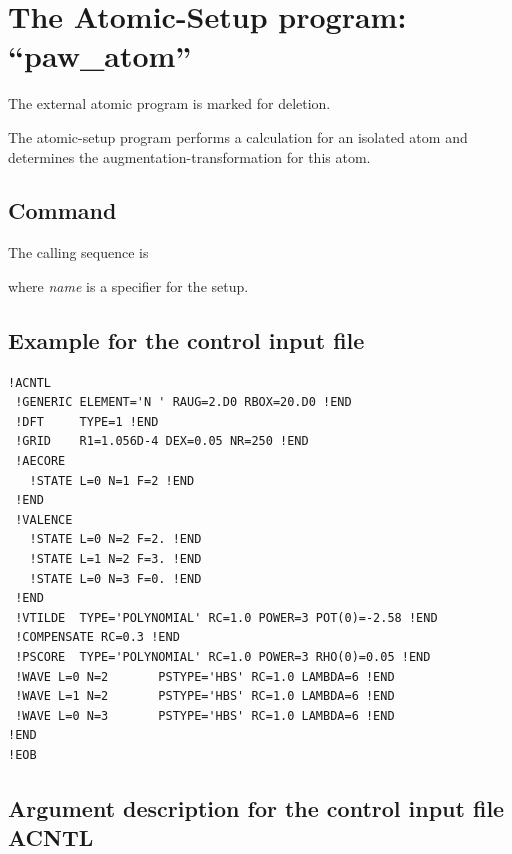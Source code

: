 \documentclass[final,12pt]{article}
\begin{document}
{{{\section{The Atomic-Setup program: ``paw\_atom''}
The external atomic program is marked for deletion. 


The atomic-setup program performs a calculation for an isolated atom
and determines the augmentation-transformation for this atom.




\subsection{Command}
The calling sequence is

\bigskip{}\bigskip

\noindent
where {\it name} is a specifier for the setup. 

\subsection{Example for the control input file}

\begin{verbatim}
!ACNTL
 !GENERIC ELEMENT='N ' RAUG=2.D0 RBOX=20.D0 !END
 !DFT     TYPE=1 !END
 !GRID    R1=1.056D-4 DEX=0.05 NR=250 !END
 !AECORE
   !STATE L=0 N=1 F=2 !END
 !END
 !VALENCE
   !STATE L=0 N=2 F=2. !END
   !STATE L=1 N=2 F=3. !END
   !STATE L=0 N=3 F=0. !END
 !END
 !VTILDE  TYPE='POLYNOMIAL' RC=1.0 POWER=3 POT(0)=-2.58 !END
 !COMPENSATE RC=0.3 !END
 !PSCORE  TYPE='POLYNOMIAL' RC=1.0 POWER=3 RHO(0)=0.05 !END
 !WAVE L=0 N=2       PSTYPE='HBS' RC=1.0 LAMBDA=6 !END
 !WAVE L=1 N=2       PSTYPE='HBS' RC=1.0 LAMBDA=6 !END
 !WAVE L=0 N=3       PSTYPE='HBS' RC=1.0 LAMBDA=6 !END
!END
!EOB
\end{verbatim}



\subsection{Argument description for the control input file ACNTL}

}}}
\end{document}
